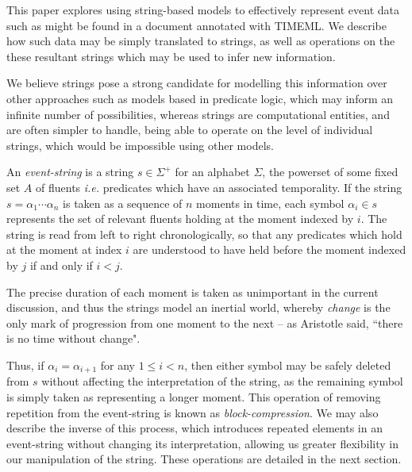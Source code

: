 \documentclass[a4paper,11pt]{article}
\begin{document}
This paper explores using string-based models to effectively represent event 
data such as might be found in a document annotated with TIMEML. We describe 
how such data may be simply translated to strings, as well as operations on the 
these resultant strings which may be used to infer new information.

We believe strings pose a strong candidate for modelling this information over 
other approaches such as models based in predicate logic, which may inform an 
infinite number of possibilities, whereas strings are computational entities, 
and are often simpler to handle, being able to operate on the level of 
individual strings, which would be impossible using other models.

An \textit{event-string} is a string $s \in \Sigma^+$ for an alphabet 
$\Sigma$, the powerset of some fixed set $A$ of fluents \textit{i.e.} 
predicates which have an associated temporality. If the 
string $s = \alpha_1\cdots\alpha_n$ is taken as a sequence of $n$ moments in 
time, each symbol $\alpha_i \in s$ represents the set of relevant fluents 
holding at the 
moment indexed by $i$. The string is read from left to right chronologically, 
so that any predicates which hold at the moment at index $i$ are understood to 
have held before the moment indexed by $j$ if and only if $i < j$.

The precise duration of each moment is taken as unimportant in the current 
discussion, 
and thus the strings model an inertial world, whereby \textit{change} is the 
only mark of progression from one moment to the next -- as Aristotle said, 
``there is no time 
without change".

Thus, if $\alpha_i = \alpha_{i+1}$ for any 
$1 \leq i < n$, then either symbol may be safely deleted from $s$ without 
affecting the interpretation of the string, as the remaining symbol is simply 
taken as representing a longer moment. This operation of removing 
repetition from 
the event-string is known as \textit{block-compression}. We may also describe 
the inverse of this process, which introduces repeated elements in an 
event-string without changing its interpretation, allowing us greater 
flexibility in our manipulation of the string. These operations are detailed 
in the next section.
\end{document}
